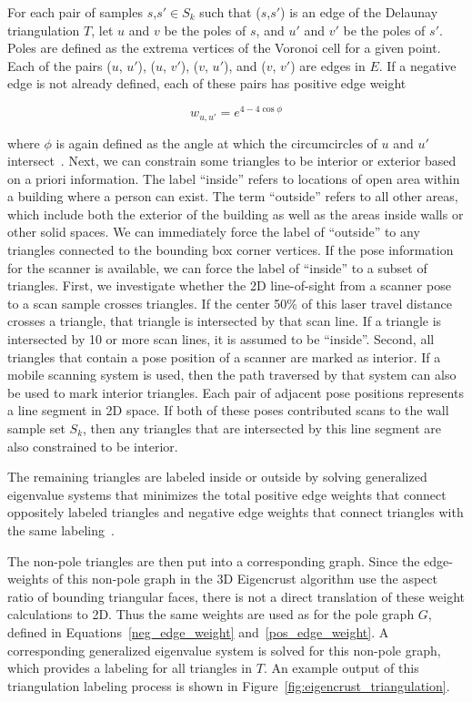 \documentclass[12pt,onecolumn,oneside]{book}
\begin{document}
For each pair of samples $s$,$s' \in S_k$ such that ($s$,$s'$) is an edge of the Delaunay triangulation $T$, let $u$ and $v$ be the poles of $s$, and $u'$ and $v'$ be the poles of $s'$.  Poles are defined as the extrema vertices of the Voronoi cell for a given point.  Each of the pairs ($u$, $u'$), ($u$, $v'$), ($v$, $u'$), and ($v$, $v'$) are edges in $E$.  If a negative edge is not already defined, each of these pairs has positive edge weight

\begin{equation}
w_{u,u'} = e ^ {4 - 4 \cos \phi}
\label{pos_edge_weight}
\end{equation}

\noindent where $\phi$ is again defined as the angle at which the circumcircles of $u$ and $u'$ intersect~\cite{EigencrustShewchuk}.  Next, we can constrain some triangles to be interior or exterior based on a priori information.  The label ``inside'' refers to locations of open area within a building where a person can exist.  The term ``outside'' refers to all other areas, which include both the exterior of the building as well as the areas inside walls or other solid spaces.  We can immediately force the label of ``outside'' to any triangles connected to the bounding box corner vertices.  If the pose information for the scanner is available, we can force the label of ``inside'' to a subset of triangles.  First, we investigate whether the 2D line-of-sight from a scanner pose to a scan sample crosses triangles.  If the center 50\% of this laser travel distance crosses a triangle, that triangle is intersected by that scan line.  If a triangle is intersected by 10 or more scan lines, it is assumed to be ``inside''.  Second, all triangles that contain a pose position of a scanner are marked as interior.  If a mobile scanning system is used, then the path traversed by that system can also be used to mark interior triangles.  Each pair of adjacent pose positions represents a line segment in 2D space.  If both of these poses contributed scans to the wall sample set $S_k$, then any triangles that are intersected by this line segment are also constrained to be interior.

The remaining triangles are labeled inside or outside by solving generalized eigenvalue systems that minimizes the total positive edge weights that connect oppositely labeled triangles and negative edge weights that connect triangles with the same labeling~\cite{EigencrustShewchuk}.

The non-pole triangles are then put into a corresponding graph.  Since the edge-weights of this non-pole graph in the 3D Eigencrust algorithm use the aspect ratio of bounding triangular faces, there is not a direct translation of these weight calculations to 2D.  Thus the same weights are used as for the pole graph $G$, defined in Equations~\ref{neg_edge_weight} and~\ref{pos_edge_weight}.  A corresponding generalized eigenvalue system is solved for this non-pole graph, which provides a labeling for all triangles in $T$.  An example output of this triangulation labeling process is shown in Figure~\ref{fig:eigencrust_triangulation}.
\end{document}
